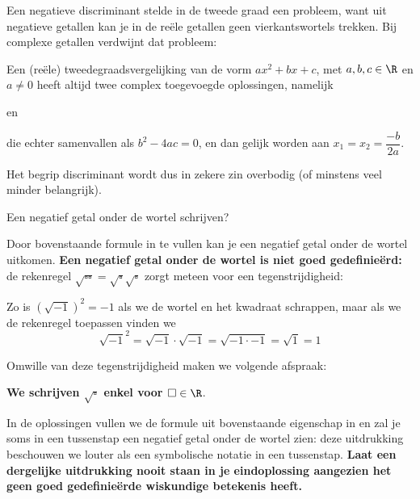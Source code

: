 \documentclass{ximera}
\begin{document}
    Een negatieve discriminant stelde in de tweede graad een probleem, want uit negatieve getallen kan je in de reële getallen geen vierkantswortels trekken.
    Bij complexe getallen verdwijnt dat probleem:

    \begin{proposition}\nl

        Een (reële) tweedegraadsvergelijking van de vorm $ax^2+bx+c$, met $a,b,c\in\R$ en $a\neq0$
        heeft altijd twee complex toegevoegde oplossingen, namelijk 
        \begin{center}
             en 
        \end{center}
        die echter samenvallen als $b^2-4ac=0$, en dan gelijk worden aan $x_1=x_2=\dfrac{-b}{2a}$.
    \end{proposition}
    Het begrip discriminant wordt dus in zekere zin overbodig (of minstens veel minder belangrijk).


    \begin{remark}{Een negatief getal onder de wortel schrijven?}

        Door bovenstaande formule in te vullen kan je een negatief getal onder de wortel uitkomen. 
        \textbf{Een negatief getal onder de wortel is niet goed gedefinieërd:} de rekenregel \(\sqrt{\square \square} = \sqrt{\square}\sqrt{\square}\) zorgt meteen voor een tegenstrijdigheid: 

    Zo is $(\sqrt{-1})^2 = -1 $ als we de wortel en het kwadraat schrappen, maar als we de rekenregel toepassen vinden we 
    $$\sqrt{-1}^2 = \sqrt{-1} \cdot \sqrt{-1} = \sqrt{-1 \cdot -1} = \sqrt{1} = 1 $$

    Omwille van deze tegenstrijdigheid maken we volgende afspraak: 
    \begin{center} 
        \textbf{We schrijven \(\sqrt{\square}\) enkel voor \( \square \in \R \)}. 
    \end{center}

    In de oplossingen vullen we de formule uit bovenstaande eigenschap in en zal je soms in een tussenstap een negatief getal onder de wortel zien: deze uitdrukking beschouwen we louter als een symbolische notatie in een tussenstap.   
    \textbf{Laat een dergelijke uitdrukking nooit staan in je eindoplossing aangezien het geen goed gedefinieërde wiskundige betekenis heeft.}        
    \end{remark}
\end{document}
